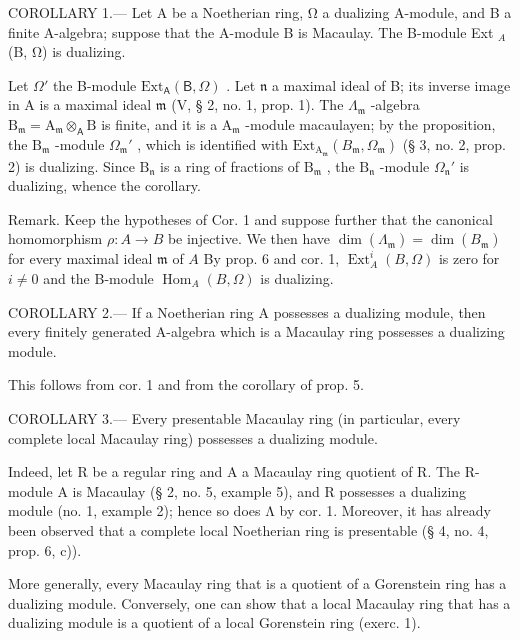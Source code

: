 COROLLARY 1.--- Let A be a Noetherian ring, Ω a dualizing A-module, and B a finite A-algebra; suppose that the A-module B is Macaulay. The B-module Ext \(_{A}\) (B, Ω) is dualizing.

Let \(\Omega'\) the B-module \(\mathrm{Ext}_{\mathsf{A}}(\mathsf{B},\Omega)\) . Let \(\mathfrak{n}\) a maximal ideal of B; its inverse image in A is a maximal ideal \(\mathfrak{m}\) (V, § 2, no. 1, prop. 1). The \(\Lambda_{\mathfrak{m}}\) -algebra \(\mathrm{B}_{\mathfrak{m}} = \mathrm{A}_{\mathfrak{m}} \otimes_{\mathsf{A}} \mathrm{B}\) is finite, and it is a \(\mathrm{A}_{\mathfrak{m}}\) -module macaulayen; by the proposition, the \(\mathrm{B}_{\mathfrak{m}}\) -module \(\Omega_{\mathfrak{m}}'\) , which is identified with \(\mathrm{Ext}_{\mathrm{A}_{\mathfrak{m}}}(B_{\mathfrak{m}},\Omega_{\mathfrak{m}})\) (§ 3, no. 2, prop. 2) is dualizing. Since \(\mathrm{B}_{\mathfrak{n}}\) is a ring of fractions of \(\mathrm{B}_{\mathfrak{m}}\) , the \(\mathrm{B}_{\mathfrak{n}}\) -module \(\Omega_{\mathfrak{n}}'\) is dualizing, whence the corollary.

Remark. Keep the hypotheses of Cor. 1 and suppose further that the canonical homomorphism \(\rho : A \to B\) be injective. We then have \(\dim(\Lambda_{\mathfrak{m}}) = \dim(B_{\mathfrak{m}})\) for every maximal ideal \(\mathfrak{m}\) of \(A\) By prop. 6 and cor. 1, \(\operatorname{Ext}_{A}^{i}(B, \Omega)\) is zero for \(i \neq 0\) and the B-module \(\operatorname{Hom}_{A}(B, \Omega)\) is dualizing.

COROLLARY 2.--- If a Noetherian ring A possesses a dualizing module, then every finitely generated A-algebra which is a Macaulay ring possesses a dualizing module.

This follows from cor. 1 and from the corollary of prop. 5.

COROLLARY 3.--- Every presentable Macaulay ring (in particular, every complete local Macaulay ring) possesses a dualizing module.

Indeed, let R be a regular ring and A a Macaulay ring quotient of R. The R-module A is Macaulay (§ 2, no. 5, example 5), and R possesses a dualizing module (no. 1, example 2); hence so does Λ by cor. 1. Moreover, it has already been observed that a complete local Noetherian ring is presentable (§ 4, no. 4, prop. 6, c)).

More generally, every Macaulay ring that is a quotient of a Gorenstein ring has a dualizing module. Conversely, one can show that a local Macaulay ring that has a dualizing module is a quotient of a local Gorenstein ring (exerc. 1).

